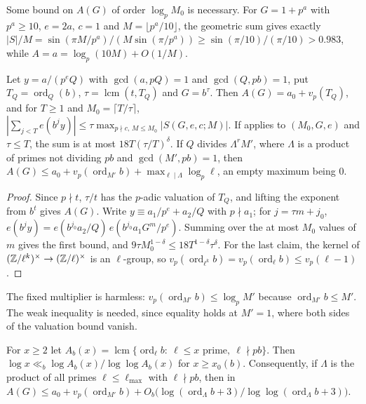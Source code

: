 \documentclass[11pt]{article}
\DeclareMathOperator{\ord}{ord}
\DeclareMathOperator{\lcm}{lcm}
\begin{document}
Some bound on $A(G)$ of order $\log_pM_0$ is necessary. For $G=1+p^a$ with $p^a\ge10$, $e=2a$, $c=1$ and
$M=\lfloor p^a/10\rfloor$, the geometric sum gives exactly
$|S|/M=\sin(\pi M/p^a)/(M\sin(\pi/p^a))\ge\sin(\pi/10)/(\pi/10)>0.983$, while $A=a=\log_p(10M)+O(1/M)$.

\begin{corollary}\label{cor:split}
Let $y=a/(p^eQ)$ with $\gcd(a,pQ)=1$ and $\gcd(Q,pb)=1$, put $T_Q=\ord_Q(b)$, $\tau=\lcm(t,T_Q)$ and $G=b^\tau$. Then
$A(G)=a_0+v_p(T_Q)$, and for $T\ge1$ and $M_0=\lceil T/\tau\rceil$,
$|\sum_{j<T}e(b^jy)|\le\tau\max_{p\nmid c,\,M\le M_0}|S(G,e,c;M)|$. If  applies to $(M_0,G,e)$ and
$\tau\le T$, the sum is at most $18T(\tau/T)^\delta$. If $Q$ divides $\Lambda^rM'$, where $\Lambda$ is a product of primes not
dividing $pb$ and $\gcd(M',pb)=1$, then $A(G)\le a_0+v_p(\ord_{M'}b)+\max_{\ell\mid\Lambda}\log_p\ell$, an empty maximum being $0$.
\end{corollary}

\begin{proof}
Since $p\nmid t$, $\tau/t$ has the $p$-adic valuation of $T_Q$, and lifting the exponent from $b^t$ gives $A(G)$. Write
$y\equiv a_1/p^e+a_2/Q$ with $p\nmid a_1$; for $j=\tau m+j_0$, $e(b^jy)=e(b^{j_0}a_2/Q)\,e(b^{j_0}a_1G^m/p^e)$. Summing over the
at most $M_0$ values of $m$ gives the first bound, and $9\tau M_0^{1-\delta}\le18T^{1-\delta}\tau^\delta$. For the last claim, the
kernel of $(\mathbb Z/\ell^k)^\times\to(\mathbb Z/\ell)^\times$ is an $\ell$-group, so $v_p(\ord_{\ell^k}b)=v_p(\ord_\ell b)\le v_p(\ell-1)$.
\end{proof}

The fixed multiplier is harmless: $v_p(\ord_{M'}b)\le\log_pM'$ because $\ord_{M'}b\le M'$. The weak inequality is
needed, since equality holds at $M'=1$, where both sides of the valuation bound vanish.

\begin{lemma}\label{lem:largestprime}
For $x\ge2$ let $A_b(x)=\lcm\{\ord_\ell b:\ \ell\le x\text{ prime},\ \ell\nmid pb\}$. Then $\log x\ll_b\log A_b(x)/\log\log A_b(x)$
for $x\ge x_0(b)$. Consequently, if $\Lambda$ is the product of all primes $\ell\le\ell_{\max}$ with $\ell\nmid pb$, then in
 $A(G)\le a_0+v_p(\ord_{M'}b)+O_b\bigl(\log(\ord_\Lambda b+3)/\log\log(\ord_\Lambda b+3)\bigr)$.
\end{lemma}
\end{document}
